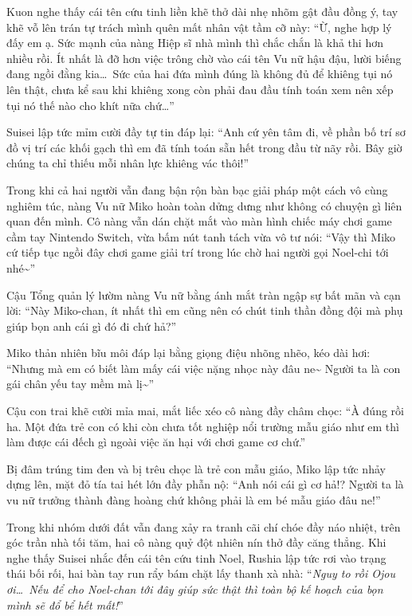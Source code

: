 \documentclass[../main.tex]{subfiles}
\begin{document}
Kuon nghe thấy cái tên cứu tinh liền khẽ thở dài nhẹ nhõm gật đầu đồng ý, tay khẽ vỗ lên trán tự trách mình quên mất nhân vật tầm cỡ này: ``Ừ, nghe hợp lý đấy em ạ. Sức mạnh của nàng Hiệp sĩ nhà mình thì chắc chắn là khả thi hơn nhiều rồi. Ít nhất là đỡ hơn việc trông chờ vào cái tên Vu nữ hậu đậu, lười biếng đang ngồi đằng kia\dots\ Sức của hai đứa mình đúng là không đủ để khiêng tụi nó lên thật, chưa kể sau khi khiêng xong còn phải đau đầu tính toán xem nên xếp tụi nó thế nào cho khít nữa chứ\dots''

Suisei lập tức mỉm cười đầy tự tin đáp lại: ``Anh cứ yên tâm đi, về phần bố trí sơ đồ vị trí các khối gạch thì em đã tính toán sẵn hết trong đầu từ nãy rồi. Bây giờ chúng ta chỉ thiếu mỗi nhân lực khiêng vác thôi!''

Trong khi cả hai người vẫn đang bận rộn bàn bạc giải pháp một cách vô cùng nghiêm túc, nàng Vu nữ Miko hoàn toàn dửng dưng như không có chuyện gì liên quan đến mình. Cô nàng vẫn dán chặt mắt vào màn hình chiếc máy chơi game cầm tay Nintendo Switch, vừa bấm nút tanh tách vừa vô tư nói: ``Vậy thì Miko cứ tiếp tục ngồi đây chơi game giải trí trong lúc chờ hai người gọi Noel-chi tới nhé\~{}''

Cậu Tổng quản lý lườm nàng Vu nữ bằng ánh mắt tràn ngập sự bất mãn và cạn lời: ``Này Miko-chan, ít nhất thì em cũng nên có chút tinh thần đồng đội mà phụ giúp bọn anh cái gì đó đi chứ hả?''

Miko thản nhiên bĩu môi đáp lại bằng giọng điệu nhõng nhẽo, kéo dài hơi: ``Nhưng mà em có biết làm mấy cái việc nặng nhọc này đâu ne\~{} Người ta là con gái chân yếu tay mềm mà lị\~{}''

Cậu con trai khẽ cười mỉa mai, mắt liếc xéo cô nàng đầy châm chọc: ``À đúng rồi ha. Một đứa trẻ con có khi còn chưa tốt nghiệp nổi trường mẫu giáo như em thì làm được cái đếch gì ngoài việc ăn hại với chơi game cơ chứ.''

Bị đâm trúng tim đen và bị trêu chọc là trẻ con mẫu giáo, Miko lập tức nhảy dựng lên, mặt đỏ tía tai hét lớn đầy phẫn nộ: ``Anh nói cái gì cơ hả!? Người ta là vu nữ trưởng thành đàng hoàng chứ không phải là em bé mẫu giáo đâu ne!''

Trong khi nhóm dưới đất vẫn đang xảy ra tranh cãi chí chóe đầy náo nhiệt, trên góc trần nhà tối tăm, hai cô nàng quỷ đột nhiên nín thở đầy căng thẳng. Khi nghe thấy Suisei nhắc đến cái tên cứu tinh Noel, Rushia lập tức rơi vào trạng thái bối rối, hai bàn tay run rẩy bám chặt lấy thanh xà nhà: ``\textit{Nguy to rồi Ojou ơi\dots\ Nếu để cho Noel-chan tới đây giúp sức thật thì toàn bộ kế hoạch của bọn mình sẽ đổ bể hết mất!}''
\end{document}
